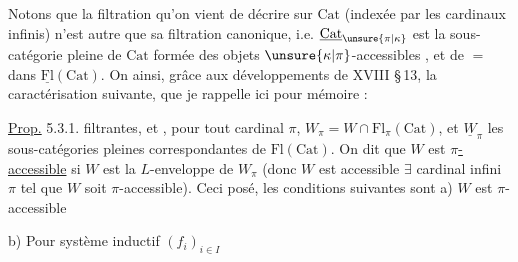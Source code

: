 Notons que la filtration qu'on vient de décrire sur $\mathrm{Cat}$ (indexée par les  cardinaux infinis) n'est autre que sa filtration canonique,  i.e. $\underline{\mathrm{Cat}}_{\unsure{\pi|\kappa}}$ est la sous-catégorie pleine de $\mathrm{Cat}$ formée des objets $\unsure{\kappa|\pi}$-accessibles , et de $=$ dans $\underline{\mathrm{Fl}}(\mathrm{Cat})$. On
 ainsi, grâce aux développements de XVIII \S\,13, la caractérisation suivante, que je rappelle ici pour mémoire  :

\uline{Prop.} 5.3.1.   filtrantes, et , pour  tout cardinal  $\pi$,
$W_\pi=W\cap\mathrm{Fl}_{\pi}(\mathrm{Cat})$, et  $\underline W_\pi$ les sous-catégories  pleines correspondantes de $\mathrm{Fl}(\mathrm{Cat})$. On dit que $W$ est \uline{$\pi$-accessible} si $W$ est la $L$-enveloppe de $W_\pi$ (donc $W$ est accessible  $\exists$ cardinal infini $\pi$ tel que $W$ soit $\pi$-accessible). Ceci posé, les conditions suivantes sont 
a) $W$ est  $\pi$-accessible

b) Pour  système inductif $(f_i)_{i\in I}$
